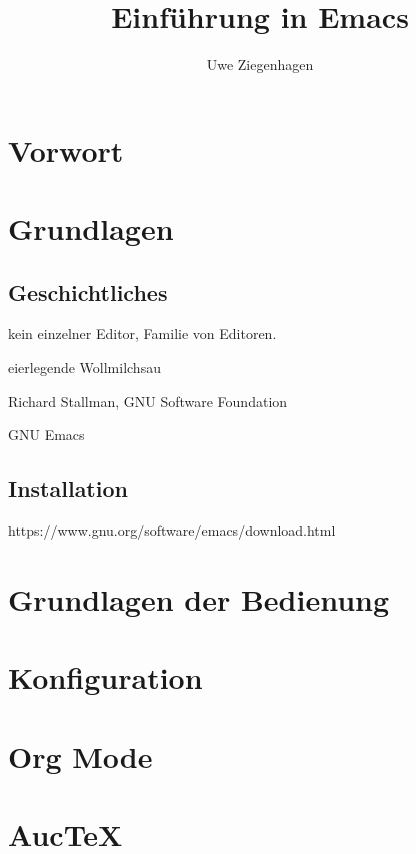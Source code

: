 \documentclass[12pt,ngerman]{scrbook}
\title{Einführung in Emacs}
\author{Uwe Ziegenhagen}
\begin{document}
\maketitle

\frontmatter
\tableofcontents



\chapter*{Vorwort}


\mainmatter


\chapter{Grundlagen}

\section{Geschichtliches}

kein einzelner Editor, Familie von Editoren. 

eierlegende Wollmilchsau

Richard Stallman, GNU Software Foundation

GNU Emacs



\section{Installation}

https://www.gnu.org/software/emacs/download.html



\chapter{Grundlagen der Bedienung}


\chapter{Konfiguration}


\chapter{Org Mode}

\chapter{Auc\TeX}
\end{document}
